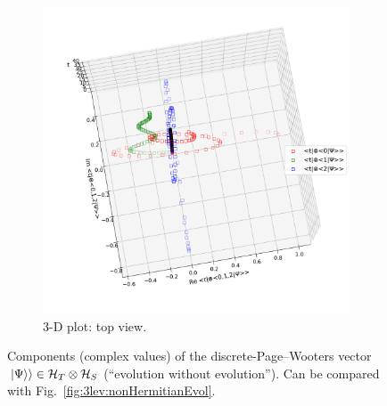 \begin{figure}[h]
\begin{subfigure}[b]{\textwidth}
    \includegraphics[height=0.48\textheight,clip,trim= 0 60 0 100]{img/3ldetect/PWSpaceTime_top.pdf}
    \caption{3-D plot: top view.}
  \end{subfigure}
  \caption{
    Components (complex values) of the discrete-Page--Wooters vector
    $\left.\left| \Psi \right\rangle\right\rangle \in \mathcal{H}_T \otimes \mathcal{H}_S$
    (``evolution without evolution'').
    Can be compared with Fig.~\ref{fig:3lev:nonHermitianEvol}.
  }
  \label{fig:3lev:PWSpaceTime}
\end{figure}

